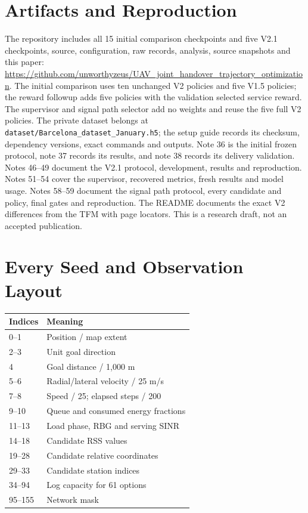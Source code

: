 \section{Artifacts and Reproduction}
The repository includes all 15 initial comparison checkpoints and five V2.1
checkpoints, source, configuration, raw
records, analysis, source snapshots and this paper:
\url{https://github.com/unworthyzeus/UAV_joint_handover_trajectory_optimization}.
The initial comparison uses ten unchanged V2 policies and five V1.5 policies;
the reward followup adds five policies with the validation selected service reward.
The supervisor and signal path selector add no weights and reuse the five full V2 policies.
The private
dataset belongs at \texttt{dataset/Barcelona\_dataset\_January.h5}; the setup
guide records its checksum, dependency versions, exact commands and outputs.
Note 36 is the initial frozen protocol, note 37 records its results, and
note 38 records its delivery validation. Notes 46--49 document the V2.1
protocol, development, results and reproduction. Notes 51--54 cover the supervisor,
recovered metrics, fresh results and model usage. Notes 58--59 document the
signal path protocol, every candidate and policy, final gates and reproduction.
The README documents the exact V2 differences from the
TFM with page locators. This is a research draft, not an accepted publication.

\section{Every Seed and Observation Layout}

\medskip



\par\noindent\begin{minipage}{\columnwidth}
\centering\small
\begin{tabular}{ll}\toprule
Indices & Meaning\\\midrule
0--1 & Position / map extent\\
2--3 & Unit goal direction\\
4 & Goal distance / 1,000 m\\
5--6 & Radial/lateral velocity / 25 m/s\\
7--8 & Speed / 25; elapsed steps / 200\\
9--10 & Queue and consumed energy fractions\\
11--13 & Load phase, RBG and serving SINR\\
14--18 & Candidate RSS values\\
19--28 & Candidate relative coordinates\\
29--33 & Candidate station indices\\
34--94 & Log capacity for 61 options\\
95--155 & Network mask\\\bottomrule
\end{tabular}
\end{minipage}\par

